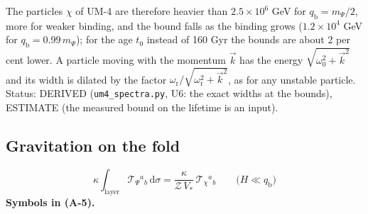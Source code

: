 \documentclass[
  10pt,
]{article}
\begin{document}
The particles \(\chi\) of UM-4 are therefore heavier than
\(2.5\times10^6\) GeV for \(q_{\mathrm{b}} = m_\Psi/2\), more for weaker
binding, and the bound falls as the binding grows (\(1.2\times10^4\) GeV
for \(q_{\mathrm{b}} = 0.99\,m_\Psi\)); for the age \(t_0\) instead of
160 Gyr the bounds are about 2 per cent lower. A particle moving with
the momentum \(\vec k\) has the energy \(\sqrt{\omega_0^2 + \vec k^2}\)
and its width is dilated by the factor
\(\omega_{\mathrm{r}}/\sqrt{\omega_{\mathrm{r}}^2 + \vec k^2}\), as for
any unstable particle. Status: DERIVED (\texttt{um4\_spectra.py}, U6:
the exact widths at the bounds), ESTIMATE (the measured bound on the
lifetime is an input).

\hypertarget{gravitation-on-the-fold}{%
\subsection{Gravitation on the fold}\label{gravitation-on-the-fold}}

\[
\kappa\int_{\text{layer}}\mathcal{T}_\Psi{}^a{}_b\,\mathrm{d}\sigma = \frac{\kappa}{\mathcal{Z}\,V_*}\,\mathcal{T}_\chi{}^a{}_b\qquad\big(H \ll q_{\mathrm{b}}\big) \tag{A-5}
\] \textbf{Symbols in (A-5).}
\end{document}

